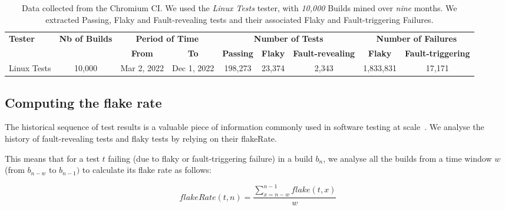 \begin{table}[ht]
\centering
\caption{Data collected from the Chromium CI. We used the \textit{Linux Tests} tester, with \textit{10,000} Builds mined over \textit{nine} months. We extracted Passing, Flaky and Fault-revealing tests and their associated Flaky and Fault-triggering Failures.}
\vspace{-0.5em}
\label{table:infoDataset}
\begin{tabular}{ l | c | c c | c c c | c c } 
\toprule
\multirow{2}{*}{\textbf{Tester}} & \multirow{2}{*}{\textbf{Nb of Builds}} & \multicolumn{2}{c|}{\textbf{Period of Time}} & \multicolumn{3}{c|}{\textbf{Number of Tests}} & \multicolumn{2}{c}{\textbf{Number of Failures}} \\
{} & {} & \textbf{From} & \textbf{To} & \textbf{Passing} & \textbf{Flaky} & \textbf{Fault-revealing} & \textbf{Flaky} & \textbf{Fault-triggering} \\
\midrule 
Linux Tests & 10,000 & Mar 2, 2022 & Dec 1, 2022 & 198,273 & 23,374 & 2,343  & 1,833,831 & 17,171 \\
\bottomrule
\end{tabular}
\end{table}

\subsection{Computing the flake rate}
\label{sec:testHistory}

The historical sequence of test results is a valuable piece of information commonly used in software testing at scale~\cite{LeongSPTM19,Kowalczyk2020}. We analyse the history of fault-revealing tests and flaky tests by relying on their \textsf{flakeRate}.

This means that for a test $t$ failing (due to flaky or fault-triggering failure) in a build $b_{n}$, we analyse all the builds from a time window $w$ (\ie from $b_{n-w}$ to $b_{n-1})$ to calculate its flake rate as follows: \\

\noindent\begin{minipage}{\linewidth}
\begin{equation}
  flakeRate(t,n) = \frac{ \sum_{x=n-w}^{n-1} flake(t,x) } {w}
\end{equation}
\end{minipage}%
\\


